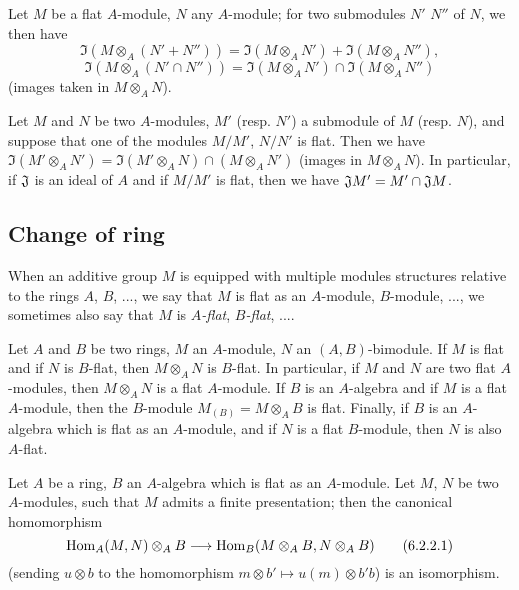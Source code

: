 \begin{env}[6.1.3]
\label{0.6.1.3}
Let $M$ be a flat $A$-module, $N$ any $A$-module; for two submodules $N'$ $N''$ of $N$, we then have
\[
  \Im(M\otimes_A(N'+N''))=\Im(M\otimes_A N')+\Im(M\otimes_A N''),
\]
\[
  \Im(M\otimes_A(N'\cap N''))=\Im(M\otimes_A N')\cap\Im(M\otimes_A N'')
\]
(images taken in $M\otimes_A N$).
\end{env}

\begin{env}[6.1.4]
\label{0.6.1.4}
Let $M$ and $N$ be two $A$-modules, $M'$ (resp. $N'$) a submodule of $M$ (resp. $N$), and suppose that one of the modules $M/M'$, $N/N'$ is flat.
Then we have $\Im(M'\otimes_A N')=\Im(M'\otimes_A N)\cap(M\otimes_A N')$ (images in $M\otimes_A N$).
In particular, if $\mathfrak{J}$ is an ideal of $A$ and if $M/M'$ is flat, then we have $\mathfrak{J}M'=M'\cap\mathfrak{J}M$.
\end{env}

\subsection{Change of ring}
\label{subsection:0.6.2}

When an additive group $M$ is equipped with multiple modules structures relative
to the rings $A$, $B$, ..., we say that $M$ is flat as an $A$-module,
$B$-module, ..., we sometimes also say that $M$ is \emph{$A$-flat},
\emph{$B$-flat}, ....

\begin{env}[6.2.1]
\label{0.6.2.1}
Let $A$ and $B$ be two rings, $M$ an $A$-module, $N$ an $(A,B)$-bimodule.
If $M$ is flat and if $N$ is $B$-flat, then $M\otimes_A N$ is $B$-flat.
In particular, if $M$ and $N$ are two flat $A$-modules, then $M\otimes_A N$ is a flat $A$-module.
If $B$ is an $A$-algebra and if $M$ is
a flat $A$-module, then the $B$-module $M_{(B)}=M\otimes_A B$ is flat.
Finally, if $B$ is an $A$-algebra which is flat as an $A$-module, and if $N$ is a flat $B$-module, then $N$ is also $A$-flat.
\end{env}

\begin{env}[6.2.2]
\label{0.6.2.2}
Let $A$ be a ring, $B$ an $A$-algebra which is flat as an $A$-module. Let $M$,
$N$ be two $A$-modules, such that $M$ admits a finite presentation; then the
canonical homomorphism
\[
  \Hom_A(M,N)\otimes_A B\to\Hom_B(M\otimes_A B,N\otimes_A B)
  \tag{6.2.2.1}
\]
(sending $u\otimes b$ to the homomorphism $m\otimes b'\mapsto u(m)\otimes b' b$) is an isomorphism.
\end{env}


